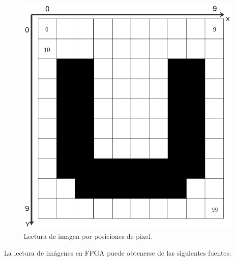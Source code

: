\documentclass[twoside,spanish,ESP,MSc]{plantillaLabUPV}
\theoremstyle{definition}
\begin{document}
\begin{figure}[!tbh]
	\centering
	\includegraphics[scale=0.3]{edrawimas/leeimag}
	\caption{Lectura de imagen por posiciones de pixel. 
	\label{u}}
\end{figure}

La lectura de imágenes en FPGA puede obtenerse de las siguientes fuentes:
\end{document}
